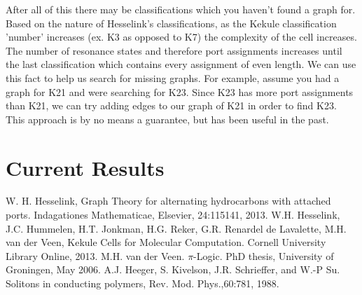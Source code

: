 \documentclass[12pt]{article}
\begin{document}
After all of this there may be classifications which you haven't found a graph for. Based on the nature of Hesselink's classifications, as the Kekule classification 'number' increases (ex. K3 as opposed to K7) the complexity of the cell increases. The number of resonance states and therefore port assignments increases until the last classification which contains every assignment of even length. We can use this fact to help us search for missing graphs. For example, assume you had a graph for K21 and were searching for K23. Since K23 has more port assignments than K21, we can try adding edges to our graph of K21 in order to find K23. This approach is by no means a guarantee, but has been useful in the past.

\section{Current Results}


\begin{thebibliography}{abrv}

 W. H. Hesselink, Graph Theory for alternating hydrocarbons with attached ports. Indagationes Mathematicae, Elsevier, 24:115141, 2013.
 W.H. Hesselink, J.C. Hummelen, H.T. Jonkman, H.G. Reker, G.R. Renardel de Lavalette, M.H. van der Veen, Kekule Cells for Molecular Computation. Cornell University Library Online, 2013.
 M.H. van der Veen. $\pi$-Logic. PhD thesis, University of Groningen, May 2006.
 A.J. Heeger, S. Kivelson, J.R. Schrieffer, and W.-P Su. Solitons in conducting polymers, Rev. Mod. Phys.,60:781, 1988.

\end{thebibliography}
\end{document}
